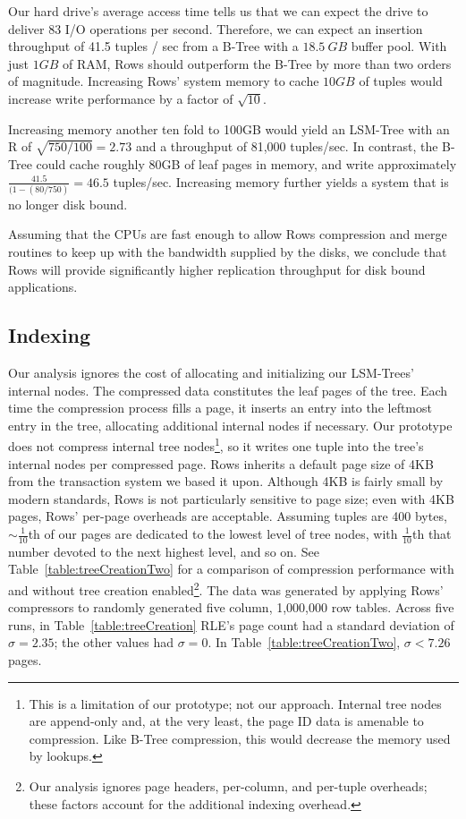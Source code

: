 \documentclass{sig-alternate-sigmod08}
\newcommand{\rows}{Rows\xspace}
\newcommand{\rowss}{Rows'\xspace}
\begin{document}
Our hard drive's average access time tells
us that we can expect the drive to deliver 83 I/O operations per
second.  Therefore, we can expect an insertion throughput of 41.5
tuples / sec from a B-Tree with a $18.5~GB$ buffer pool.  With just $1GB$ of RAM, \rows should outperform the
B-Tree by more than two orders of magnitude.  Increasing \rowss system
memory to cache $10 GB$ of tuples would increase write performance by a
factor of $\sqrt{10}$.


Increasing memory another ten fold to 100GB would yield an LSM-Tree
with an R of $\sqrt{750/100} = 2.73$ and a throughput of 81,000
tuples/sec.  In contrast, the B-Tree could cache roughly 80GB of leaf pages
in memory, and write approximately $\frac{41.5}{(1-(80/750)} = 46.5$
tuples/sec.  Increasing memory further yields a system that
is no longer disk bound.

Assuming that the CPUs are fast enough to allow \rows
compression and merge routines to keep up with the bandwidth supplied
by the disks, we conclude that \rows will provide significantly higher
replication throughput for disk bound applications.

\subsection{Indexing}

Our analysis ignores the cost of allocating and initializing our
LSM-Trees' internal nodes.  The compressed data constitutes the leaf
pages of the tree.  Each time the compression process fills a page, it
inserts an entry into the leftmost entry in the tree, allocating
additional internal nodes if necessary.  Our prototype does not compress
internal tree nodes\footnote{This is a limitation of our prototype;
  not our approach.  Internal tree nodes are append-only and, at the
  very least, the page ID data is amenable to compression. Like B-Tree
  compression, this would decrease the memory used by lookups.},
so it writes one tuple into the tree's internal nodes per compressed
page.  \rows inherits a default page size of 4KB from the transaction
system we based it upon.  Although 4KB is fairly small by modern
standards, \rows is not particularly sensitive to page size; even with
4KB pages, \rowss per-page overheads are acceptable.  Assuming tuples
are 400 bytes, $\sim\frac{1}{10}$th of our pages are dedicated to the
lowest level of tree nodes, with $\frac{1}{10}$th that number devoted
to the next highest level, and so on.  See
Table~\ref{table:treeCreationTwo} for a comparison of compression
performance with and without tree creation enabled\footnote{Our
  analysis ignores page headers, per-column, and per-tuple overheads;
  these factors account for the additional indexing overhead.}.  The
data was generated by applying \rowss compressors to randomly
generated five column, 1,000,000 row tables.  Across five runs, in
Table~\ref{table:treeCreation} RLE's page count had a standard
deviation of $\sigma=2.35$; the other values had $\sigma=0$.  In
Table~\ref{table:treeCreationTwo}, $\sigma < 7.26$ pages.
\end{document}
